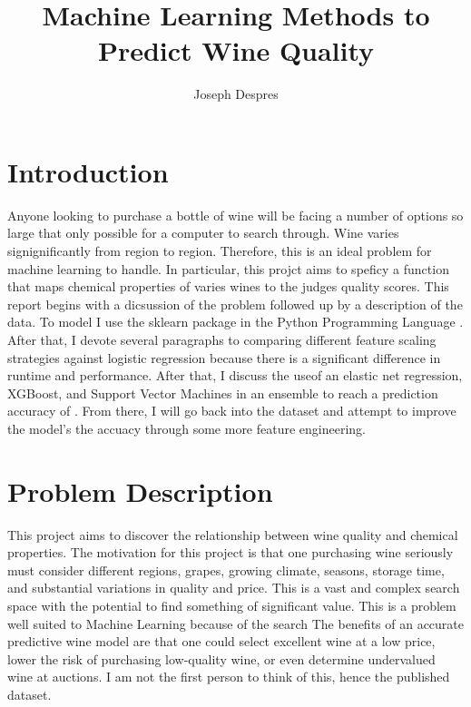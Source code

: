 \documentclass[16pt,twocolumn,letterpaper,titlepage]{article}
\title{Machine Learning Methods to Predict Wine Quality}
\author{
    Joseph Despres
}
\begin{document}
\maketitle


\onecolumn
\tableofcontents
\thispagestyle{empty}
\newpage
\twocolumn


\setcounter{page}{1}

\section{Introduction}


Anyone looking to purchase a bottle of wine will be facing a number of options so large that only possible for a computer to search through. Wine varies signignificantly from region to region. Therefore, this is an ideal problem for machine learning to handle. In particular, this projct aims to speficy a function that maps chemical properties of varies wines to the judges quality scores. This report begins with a dicsussion of the problem followed up by a description of the data. To model I use the sklearn package \cite{pedregosa2011scikit} in the Python Programming Language \cite{10.5555/1593511}. After that, I devote several paragraphs to comparing different feature scaling strategies against logistic regression because there is a significant difference in runtime and performance. After that, I discuss the useof an elastic net regression, XGBoost, and Support Vector Machines in an ensemble to reach a prediction accuracy of . From there, I will go back into the dataset and attempt to improve the model's the accuacy through some more feature engineering. 

\section{Problem Description}

This project aims to discover the relationship between wine quality and chemical properties. The motivation for this project is that one purchasing wine seriously must consider different regions, grapes, growing climate, seasons, storage time, and substantial variations in quality and price. This is a vast and complex search space with the potential to find something of significant value. This is a problem well suited to Machine Learning because of the search The benefits of an accurate predictive wine model are that one could select excellent wine at a low price, lower the risk of purchasing low-quality wine, or even determine undervalued wine at auctions. I am not the first person to think of this, hence the published dataset.
\end{document}
